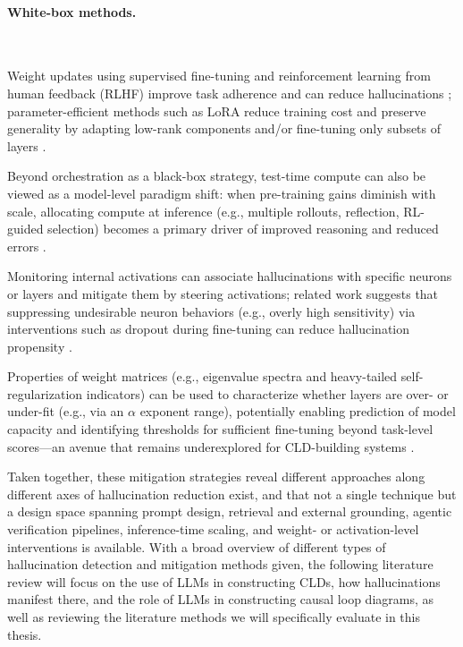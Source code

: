 \paragraph{White-box methods.}~

\begin{description}[style=unboxed,leftmargin=1em,labelindent=0pt]
    \item[Fine-tuning and RLHF.] Weight updates using supervised fine-tuning and reinforcement learning from human feedback (RLHF) improve task adherence and can reduce hallucinations \citep{ouyang2022rlhf}; parameter-efficient methods such as LoRA reduce training cost and preserve generality by adapting low-rank components and/or fine-tuning only subsets of layers \citep{hu2021lora}.

    \item[Test-time compute.] Beyond orchestration as a black-box strategy, test-time compute can also be viewed as a model-level paradigm shift: when pre-training gains diminish with scale, allocating compute at inference (e.g., multiple rollouts, reflection, RL-guided selection) becomes a primary driver of improved reasoning and reduced errors \citep{kaplan2020scaling}.

    \item[Activation monitoring and steering.] Monitoring internal activations can associate hallucinations with specific neurons or layers and mitigate them by steering activations; related work suggests that suppressing undesirable neuron behaviors (e.g., overly high sensitivity) via interventions such as dropout during fine-tuning can reduce hallucination propensity \citep{wang2024adaptive, varshney2023stitch}.

    \item[Predictive analysis of system capacity.] Properties of weight matrices (e.g., eigenvalue spectra and heavy-tailed self-regularization indicators) can be used to characterize whether layers are over- or under-fit (e.g., via an $\alpha$ exponent range), potentially enabling prediction of model capacity and identifying thresholds for sufficient fine-tuning beyond task-level scores---an avenue that remains underexplored for CLD-building systems \citep{martin2021predicting, martin2019traditional}.
\end{description}

\medskip
Taken together, these mitigation strategies reveal different approaches along different axes of hallucination reduction exist, and that not a single technique but a design space spanning prompt design, retrieval and external grounding, agentic verification pipelines, inference-time scaling, and weight- or activation-level interventions is available. With a broad overview of different types of hallucination detection and mitigation methods given, the following literature review will focus on the use of LLMs in constructing CLDs, how hallucinations manifest there, and the role of LLMs in constructing causal loop diagrams, as well as reviewing the literature methods we will specifically evaluate in this thesis.












